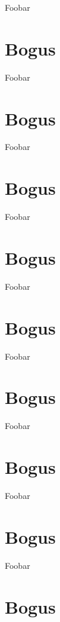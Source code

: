 \documentclass[
  letterpaper,
  DIV=11,
  numbers=noendperiod,
  oneside]{scrreprt}
\begin{document}
Foobar

\hypertarget{bogus-8}{%
\chapter{Bogus}\label{bogus-8}}

Foobar

\hypertarget{bogus-9}{%
\chapter{Bogus}\label{bogus-9}}

Foobar

\hypertarget{bogus-10}{%
\chapter{Bogus}\label{bogus-10}}

Foobar

\hypertarget{bogus-11}{%
\chapter{Bogus}\label{bogus-11}}

Foobar

\hypertarget{bogus-12}{%
\chapter{Bogus}\label{bogus-12}}

Foobar

\hypertarget{bogus-13}{%
\chapter{Bogus}\label{bogus-13}}

Foobar

\hypertarget{bogus-14}{%
\chapter{Bogus}\label{bogus-14}}

Foobar

\hypertarget{bogus-15}{%
\chapter{Bogus}\label{bogus-15}}

Foobar

\hypertarget{bogus-16}{%
\chapter{Bogus}\label{bogus-16}}
\end{document}
